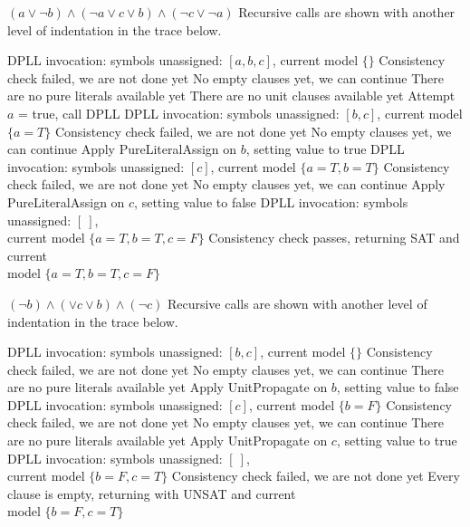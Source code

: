 \documentclass[a4paper,openany,12pt]{book}
\begin{document}
\begin{example}{$(a \lor \neg b) \land (\neg a \lor c \lor b) \land (\neg c \lor \neg a)$}
    Recursive calls are shown with another level of indentation in the trace below.
    \begin{outline}
        \1[\cogs] DPLL invocation: symbols unassigned: $[a, b, c]$, current model $\{\}$
        \1[\arrow] Consistency check failed, we are not done yet
        \1[\arrow] No empty clauses yet, we can continue
        \1[\arrow] There are no pure literals available yet
        \1[\arrow] There are no unit clauses available yet
        \1[\arrow] Attempt $a$ = true, call DPLL
        \2[\cogs] DPLL invocation: symbols unassigned: $[b, c]$, current model $\{a=T\}$
        \2[\arrow] Consistency check failed, we are not done yet
        \2[\arrow] No empty clauses yet, we can continue
        \2[\arrow] Apply PureLiteralAssign on $b$, setting value to true
        \3[\cogs] DPLL invocation: symbols unassigned: $[c]$, current model $\{a=T, b=T\}$
        \3[\arrow] Consistency check failed, we are not done yet
        \3[\arrow] No empty clauses yet, we can continue
        \3[\arrow] Apply PureLiteralAssign on $c$, setting value to false
        \4[\cogs] DPLL invocation: symbols unassigned: $[~]$,\\current model $\{a=T, b=T, c=F\}$
        \4[\checkMark] Consistency check passes, returning \textsc{SAT} and current\\model $\{a=T, b=T, c=F\}$
    \end{outline}
\end{example}


\begin{example}{$(\neg b) \land (\lor c \lor b) \land (\neg c)$}
    Recursive calls are shown with another level of indentation in the trace below.
    \begin{outline}
        \1[\cogs] DPLL invocation: symbols unassigned: $[b, c]$, current model $\{\}$
        \1[\arrow] Consistency check failed, we are not done yet
        \1[\arrow] No empty clauses yet, we can continue
        \1[\arrow] There are no pure literals available yet
        \1[\arrow] Apply UnitPropagate on $b$, setting value to false
        \2[\cogs] DPLL invocation: symbols unassigned: $[c]$, current model $\{b=F\}$
        \2[\arrow] Consistency check failed, we are not done yet
        \2[\arrow] No empty clauses yet, we can continue
        \2[\arrow] There are no pure literals available yet
        \2[\arrow] Apply UnitPropagate on $c$, setting value to true
        \3[\cogs] DPLL invocation: symbols unassigned: $[~]$,\\ current model $\{b=F, c=T\}$
        \3[\arrow] Consistency check failed, we are not done yet
        \3[\crossMark] Every clause is empty, returning with \textsc{UNSAT} and current\\model $\{b=F, c=T\}$
    \end{outline}
\end{example}
\end{document}
